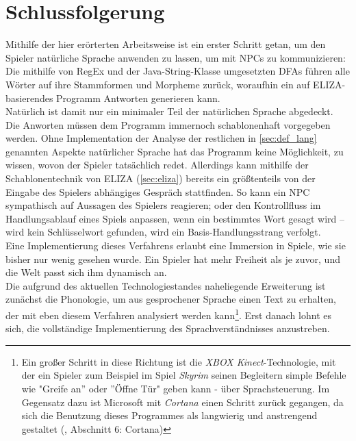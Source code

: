 \documentclass[12pt,twoside]{article}
\theoremstyle{plain}
\theoremstyle{definition}
\theoremstyle{remark}
\begin{document}
\section{Schlussfolgerung}
\label{sec:concl}
Mithilfe der hier erörterten Arbeitsweise ist ein erster Schritt getan, um den Spieler natürliche Sprache anwenden zu lassen, um mit NPCs zu kommunizieren:\\
Die mithilfe von RegEx und der Java-String-Klasse umgesetzten DFAs führen alle Wörter auf ihre Stammformen und Morpheme zurück, woraufhin ein auf ELIZA-basierendes Programm Antworten generieren kann.\\
Natürlich ist damit nur ein minimaler Teil der natürlichen Sprache abgedeckt.
Die Anworten müssen dem Programm immernoch schablonenhaft vorgegeben werden.
Ohne Implementation der Analyse der restlichen in \ref{sec:def_lang} genannten Aspekte natürlicher Sprache hat das Programm keine Möglichkeit, zu wissen, wovon der Spieler tatsächlich redet.
Allerdings kann mithilfe der Schablonentechnik von ELIZA (\ref{sec:eliza}) bereits ein größtenteils von der Eingabe des Spielers abhängiges Gespräch stattfinden.
So kann ein NPC sympathisch auf Aussagen des Spielers reagieren; oder den Kontrollfluss im Handlungsablauf eines Spiels anpassen, wenn ein bestimmtes Wort gesagt wird -- wird kein Schlüsselwort gefunden, wird ein Basis-Handlungsstrang verfolgt.\\
Eine Implementierung dieses Verfahrens erlaubt eine Immersion in Spiele, wie sie bisher nur wenig gesehen wurde.
Ein Spieler hat mehr Freiheit als je zuvor, und die Welt passt sich ihm dynamisch an.\\
Die aufgrund des aktuellen Technologiestandes naheliegende Erweiterung ist zunächst die Phonologie, um aus gesprochener Sprache einen Text zu erhalten, der mit eben diesem Verfahren analysiert werden kann\footnote{Ein großer Schritt in diese Richtung ist die \textit{XBOX Kinect}-Technologie, mit der ein Spieler zum Beispiel im Spiel \textit{Skyrim} seinen Begleitern simple Befehle wie "Greife an'' oder ''Öffne Tür" geben kann - über Sprachsteuerung. Im Gegensatz dazu ist Microsoft mit \textit{Cortana} einen Schritt zurück gegangen, da sich die Benutzung dieses Programmes als langwierig und anstrengend gestaltet (\cite{hauke}, Abschnitt 6: Cortana)}.
Erst danach lohnt es sich, die vollständige Implementierung des Sprachverständnisses anzustreben.


%
%
\newpage


\nocite{*}
\end{document}
